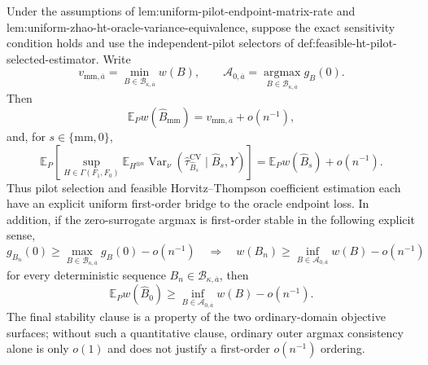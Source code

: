 Under the assumptions of lem:uniform-pilot-endpoint-matrix-rate and lem:uniform-zhao-ht-oracle-variance-equivalence, suppose the exact sensitivity condition holds and use the independent-pilot selectors of def:feasible-ht-pilot-selected-estimator.  Write
\[
v_{\mathrm{mm},\overline a}=\min_{B\in\mathcal B_{\kappa,\overline a}}w(B),
\qquad
\mathcal A_{0,\overline a}=\operatorname*{argmax}_{B\in\mathcal B_{\kappa,\overline a}}g_B(0).
\]
Then
\[
\mathbb E_P w(\widehat B_{\mathrm{mm}})
=v_{\mathrm{mm},\overline a}+o(n^{-1}),
\]
and, for \(s\in\{\mathrm{mm},0\}\),
\[
\mathbb E_P\left[
\sup_{H\in\Gamma(F_1,F_0)}
\mathbb E_{H^{\otimes n}}
\operatorname{Var}_\nu
(\widehat\tau_{\widehat B_s}^{\mathrm{CV}}\mid\widehat B_s,Y)
\right]
=\mathbb E_Pw(\widehat B_s)+o(n^{-1}).
\]
Thus pilot selection and feasible Horvitz--Thompson coefficient estimation each have an explicit uniform first-order bridge to the oracle endpoint loss.  In addition, if the zero-surrogate argmax is first-order stable in the following explicit sense,
\[
g_{B_n}(0)\ge\max_{B\in\mathcal B_{\kappa,\overline a}}g_B(0)-o(n^{-1})
\quad\Longrightarrow\quad
w(B_n)\ge\inf_{B\in\mathcal A_{0,\overline a}}w(B)-o(n^{-1})
\]
for every deterministic sequence \(B_n\in\mathcal B_{\kappa,\overline a}\), then
\[
\mathbb E_Pw(\widehat B_0)
\ge\inf_{B\in\mathcal A_{0,\overline a}}w(B)-o(n^{-1}).
\]
The final stability clause is a property of the two ordinary-domain objective surfaces; without such a quantitative clause, ordinary outer argmax consistency alone is only \(o(1)\) and does not justify a first-order \(o(n^{-1})\) ordering.